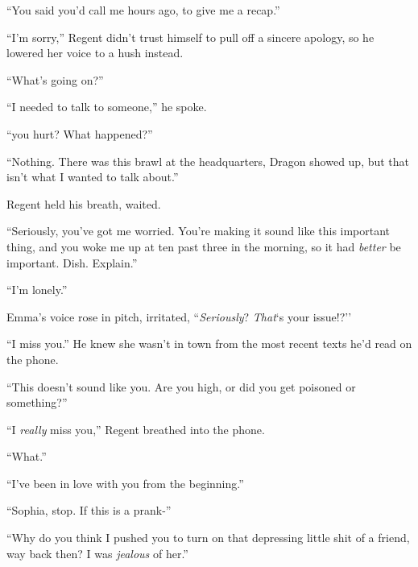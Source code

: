 ``You said you'd call me hours ago, to give me a recap.''



``I'm sorry,'' Regent didn't trust himself to pull off a sincere apology, so he lowered her voice to a hush instead.



``What's going on?''



``I needed to talk to someone,'' he spoke.



``\ldotsAre you hurt?  What happened?''



``Nothing.  There was this brawl at the headquarters, Dragon showed up, but that isn't what I wanted to talk about.''



Regent held his breath, waited.



``Seriously, you've got me worried.  You're making it sound like this important thing, and you woke me up at ten past three in the morning, so it had \emph{better} be important.  Dish.  Explain.''



``I'm lonely.''



Emma's voice rose in pitch, irritated, ``\emph{Seriously}?  \emph{That}`s your issue!?''



``I miss you.''  He knew she wasn't in town from the most recent texts he'd read on the phone.



``This doesn't sound like you.  Are you high, or did you get poisoned or something?''



``I \emph{really} miss you,'' Regent breathed into the phone.



``What.''



``I've been in love with you from the beginning.''



``Sophia, stop.  If this is a prank-''



``Why do you think I pushed you to turn on that depressing little shit of a friend, way back then?  I was \emph{jealous} of her.''



